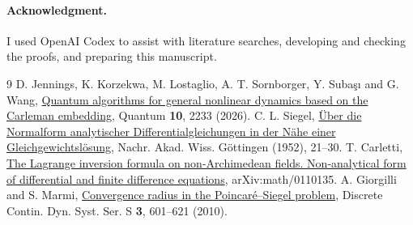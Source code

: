 \documentclass[11pt,a4paper]{article}
\begin{document}
\paragraph{Acknowledgment.} I used OpenAI Codex to assist with literature searches, developing and checking the proofs, and preparing this manuscript.

\small
\begin{thebibliography}{9}
 D. Jennings, K. Korzekwa, M. Lostaglio, A. T. Sornborger, Y. Suba\c{s}{\i} and G. Wang, \href{https://quantum-journal.org/papers/q-2026-10-08-2233/}{Quantum algorithms for general nonlinear dynamics based on the Carleman embedding}, Quantum \textbf{10}, 2233 (2026).
 C. L. Siegel, \href{https://www.mathnet.ru/eng/mat176}{\"Uber die Normalform analytischer Differentialgleichungen in der N\"ahe einer Gleichgewichtsl\"osung}, Nachr. Akad. Wiss. G\"ottingen (1952), 21--30.
 T. Carletti, \href{https://arxiv.org/abs/math/0110135}{The Lagrange inversion formula on non-Archimedean fields. Non-analytical form of differential and finite difference equations}, arXiv:math/0110135.
 A. Giorgilli and S. Marmi, \href{https://doi.org/10.3934/dcdss.2010.3.601}{Convergence radius in the Poincar\'e--Siegel problem}, Discrete Contin. Dyn. Syst. Ser. S \textbf{3}, 601--621 (2010).
\end{thebibliography}
\end{document}
